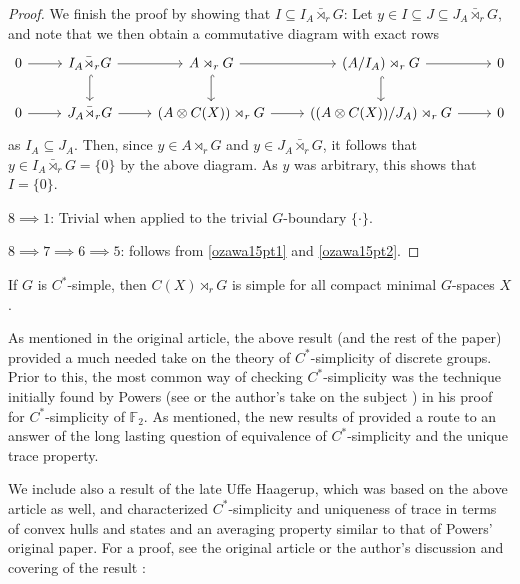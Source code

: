 \begin{proof}
	We finish the proof by showing that $I \subseteq I_A \bar \rtimes_r G$: Let $y \in I \subseteq J \subseteq J_A \bar \rtimes_r G$, and note that we then obtain a commutative diagram with exact rows
	\begin{equation*}
		\begin{tikzcd}
			0 \ar[r] &  I_A \bar \rtimes_r G \ar[d, hook] \ar[r] & A \rtimes_r G \ar[r] \ar[d, hook] & (A / I_A)\rtimes_r G  \ar[r] \ar[d, hook]  & 0\\
			0  \ar[r] & J_A \bar \rtimes_r G  \ar[r] & (A \otimes C(X)) \rtimes_r G \ar[r] & \left((A \otimes C(X))/J_A\right) \rtimes_r G \ar[r] & 0
		\end{tikzcd}
	\end{equation*}
	as $I_A \subseteq J_A$. Then, since $y \in A \rtimes_r G$ and $y \in J_A \bar \rtimes_r G$, it follows that $y \in I_A \bar \rtimes_r G = \{0\}$ by the above diagram. As $y$ was arbitrary, this shows that $I = \{0\}$.

	$8 \implies 1$: Trivial when applied to the trivial $G$-boundary $\{\cdot\}$.

	$8 \implies 7 \implies 6 \implies 5$: follows from \cref{ozawa15pt1} and \cref{ozawa15pt2}.
\end{proof}
\begin{corollary}
	If $G$ is $C^*$-simple, then $C(X) \rtimes_{r}G$ is simple for all compact minimal $G$-spaces $X$.
\end{corollary}
\begin{note}
	As mentioned in the original article, the above result (and the rest of the paper) provided a much needed take on the theory of $C^*$-simplicity of discrete groups. Prior to this, the most common way of checking $C^*$-simplicity was the technique initially found by Powers (see \cite{powers1975simplicity} or the author's take on the subject \cite[chapter 3]{bscp}) in his proof for $C^*$-simplicity of $\mathbb{F}_2$. As mentioned, the new results of \cite{breuillard2017c} provided a route to an answer of the long lasting question of equivalence of $C^*$-simplicity and the unique trace property.
\end{note}
We include also a result of the late Uffe Haagerup, which was based on the above article as well, and characterized $C^*$-simplicity and uniqueness of trace in terms of convex hulls and states and an averaging property similar to that of Powers' original paper. For a proof, see the original article \cite{haagerup2015new} or the author's discussion and covering of the result \cite[Chapter 5]{bscp}:
